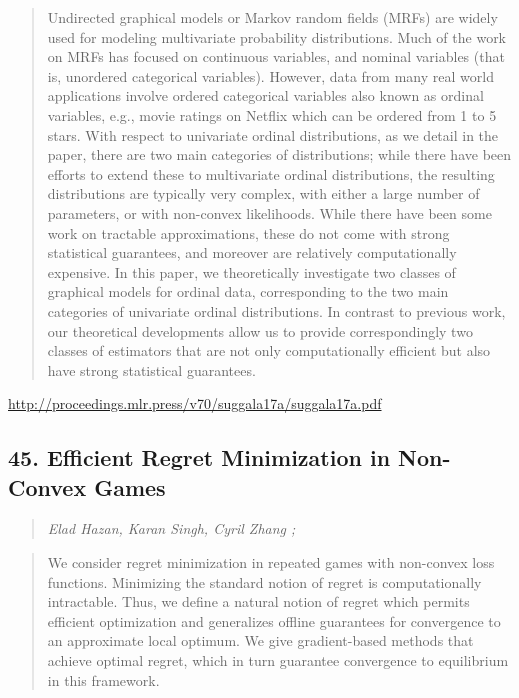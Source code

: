 \documentclass{article}
\begin{document}
\begin{quote}
    Undirected graphical models or Markov random fields (MRFs) are widely used for modeling multivariate probability distributions. Much of the work on MRFs has focused on continuous variables, and nominal variables (that is, unordered categorical variables). However, data from many real world applications involve ordered categorical variables also known as ordinal variables, e.g., movie ratings on Netflix which can be ordered from 1 to 5 stars. With respect to univariate ordinal distributions, as we detail in the paper, there are two main categories of distributions; while there have been efforts to extend these to multivariate ordinal distributions, the resulting distributions are typically very complex, with either a large number of parameters, or with non-convex likelihoods. While there have been some work on tractable approximations, these do not come with strong statistical guarantees, and moreover are relatively computationally expensive. In this paper, we theoretically investigate two classes of graphical models for ordinal data, corresponding to the two main categories of univariate ordinal distributions. In contrast to previous work, our theoretical developments allow us to provide correspondingly two classes of estimators that are not only computationally efficient but also have strong statistical guarantees.  \end{quote}

\href{http://proceedings.mlr.press/v70/suggala17a/suggala17a.pdf}{http://proceedings.mlr.press/v70/suggala17a/suggala17a.pdf}

\subsection{45. Efficient Regret Minimization in Non-Convex Games}

\begin{quote}
\footnotesize{\textit{Elad Hazan, Karan Singh, Cyril Zhang ;}}
\end{quote}

\begin{quote}
    We consider regret minimization in repeated games with non-convex loss functions. Minimizing the standard notion of regret is computationally intractable. Thus, we define a natural notion of regret which permits efficient optimization and generalizes offline guarantees for convergence to an approximate local optimum. We give gradient-based methods that achieve optimal regret, which in turn guarantee convergence to equilibrium in this framework.  \end{quote}
\end{document}

